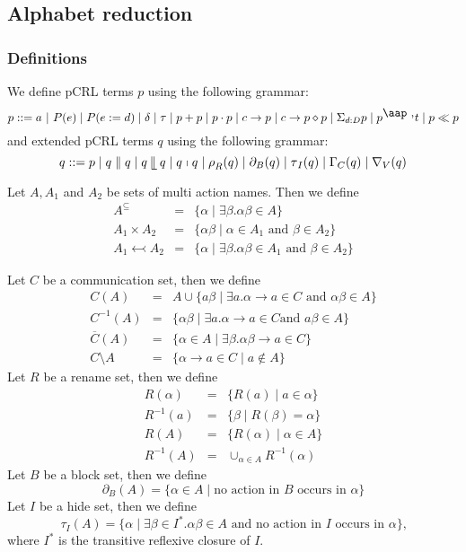 \documentclass{article}
\begin{document}
\newpage

\subsection{Alphabet reduction}

\subsubsection{Definitions}

We define pCRL terms $p$ using the following grammar:%
\[
p::=a\ \mathbf{|}\ P(e)\mid P(e:=d)\mid \delta \mid \tau \mid p+p\mid p\cdot
p\mid c\rightarrow p\mid c\rightarrow p\diamond p\mid \Sigma _{d:D}p\mid p^{%
\mathbin{\mbox{\aap ,}}}t\mid p\ll p 
\]%
and extended pCRL terms $q$ using the following grammar:%
\[
q::=p\mid q\parallel q\mid q\mathbin{\mathrel{\llfloor}}q\mid q\shortmid
q\mid \rho _{R}(q)\mid \partial _{B}(q)\mid \tau _{I}(q)\mid \Gamma
_{C}(q)\mid \nabla _{V}(q) 
\]

Let $A,A_{1}$ and $A_{2}$ be sets of multi action names. Then we define%
\begin{eqnarray*}
A^{\subseteq } &=&\{\alpha \mid \exists \beta .\alpha \beta \in A\} \\
A_{1}\times A_{2} &=&\{\alpha \beta \mid \alpha \in A_{1}\text{ and }\beta
\in A_{2}\} \\
A_{1}\leftarrowtail A_{2} &=&\{\alpha \mid \exists \beta .\alpha \beta \in
A_{1}\text{ and }\beta \in A_{2}\}
\end{eqnarray*}

Let $C$ be a communication set, then we define%
\begin{eqnarray*}
C(A) &=&A\cup \{a\beta \mid \exists a.\alpha \rightarrow a\in C\text{ and }%
\alpha \beta \in A\} \\
C^{-1}(A) &=&\{\alpha \beta \mid \exists a.\alpha \rightarrow a\in C\text{
and }a\beta \in A\} \\
\overline{C}(A) &=&\{\alpha \in A\mid \exists \beta .\alpha \beta
\rightarrow a\in C\} \\
C\setminus A &=&\{\alpha \rightarrow a\in C\mid a\notin A\}
\end{eqnarray*}%
Let $R$ be a rename set, then we define%
\begin{eqnarray*}
R(\alpha ) &=&\{R(a)\mid a\in \alpha \} \\
R^{-1}(a) &=&\{\beta \mid R(\beta )=\alpha \} \\
R(A) &=&\{R(\alpha )\mid \alpha \in A\} \\
R^{-1}(A) &=&\cup _{\alpha \in A}R^{-1}(\alpha )
\end{eqnarray*}%
Let $B$ be a block set, then we define%
\[
\partial _{B}(A)=\{\alpha \in A\mid \text{no action in }B\text{ occurs in }%
\alpha \} 
\]%
Let $I$ be a hide set, then we define%
\[
\tau _{I}(A)=\{\alpha \mid \exists \beta \in I^{\ast }.\alpha \beta \in A%
\text{ and no action in }I\text{ occurs in }\alpha \}\text{,} 
\]%
where $I^{\ast }$ is the transitive reflexive closure of $I$.\newpage
\end{document}
